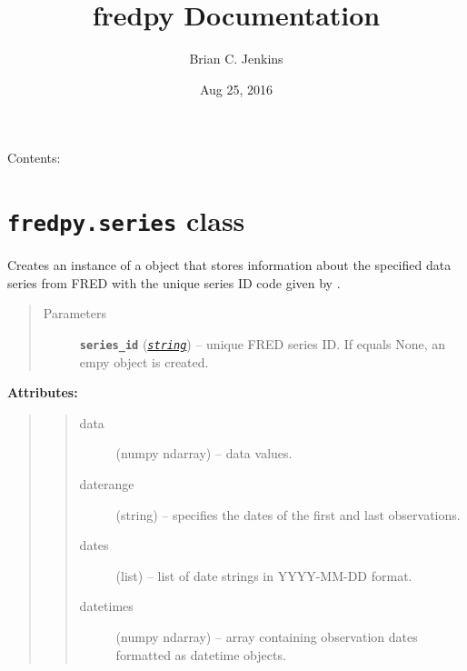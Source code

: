 \documentclass[letterpaper,10pt,english]{sphinxmanual}
\title{fredpy Documentation}
\date{Aug 25, 2016}
\author{Brian C. Jenkins}
\begin{document}
\maketitle
\tableofcontents
{}\label{index::doc}


Contents:


\chapter{\texttt{fredpy.series} class}
\label{series_class:fredpy-series-class}\label{series_class:fredpy-documentation}\label{series_class::doc}

\begin{fulllineitems}
\label{series_class:fredpy.series}
Creates an instance of a {\hyperref[series_class:fredpy.series]{}} object that stores information about the specified data series from FRED with the unique series ID code given by .
\begin{quote}\begin{description}
\item[{Parameters}] \leavevmode
\textbf{\texttt{series\_id}} (\href{https://docs.python.org/2/library/string.html\#module-string}{\emph{\texttt{string}}}) -- unique FRED series ID. If  equals None, an empy {\hyperref[series_class:fredpy.series]{}} object is created.

\end{description}\end{quote}

\textbf{Attributes:}
\begin{quote}
\begin{quote}\begin{description}
\item[{data}] \leavevmode
(numpy ndarray) --  data values.

\item[{daterange}] \leavevmode
(string) -- specifies the dates of the first and last observations.

\item[{dates}] \leavevmode
(list) -- list of date strings in YYYY-MM-DD format.

\item[{datetimes}] \leavevmode
(numpy ndarray) -- array containing observation dates formatted as datetime objects.


\end{description}
\end{quote}
\end{quote}
\end{fulllineitems}
\end{document}
